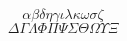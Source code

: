 \documentclass{article}
\begin{document}
$$\alpha\beta\delta\eta\gamma\iota\lambda\kappa\omega\sigma\zeta$$
$$\Delta\Gamma\Lambda\Phi\Pi\Psi\Sigma\Theta\Omega\Upsilon\Xi$$
\end{document}
